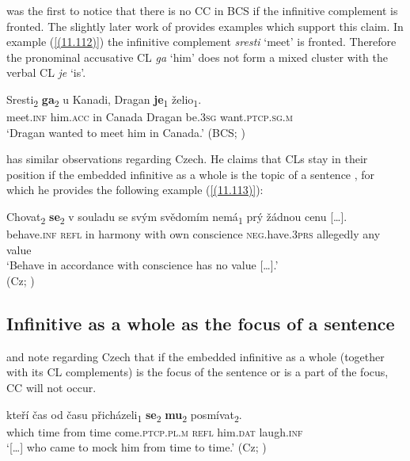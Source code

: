 \citet{Boskovic01} was the first to notice that there is no CC in BCS if the infinitive complement is fronted. The slightly later work of \citet[182f]{Stjepanovic04} provides examples which support this claim. In example (\ref{(11.112)}) the infinitive complement \textit{sresti} ‘meet’ is fronted. Therefore the pronominal accusative CL \textit{ga} ‘him’ does not form a mixed cluster with the verbal CL \textit{je} ‘is’. 

\begin{exe}\ex\label{(11.112)}
\gll Sresti\textsubscript{2} \textbf{ga}\textsubscript{2} u Kanadi, Dragan \textbf{je}\textsubscript{1} želio\textsubscript{1}. \\
meet.\textsc{inf} him.\textsc{acc} in Canada Dragan be.3\textsc{sg} want.\textsc{ptcp}.\textsc{sg}.\textsc{m} \\
\glt ‘Dragan wanted to meet him in Canada.’
\hfill (BCS; \citealt[182]{Stjepanovic04})
\end{exe}

\noindent \citet{Junghanns02} has similar observations regarding Czech. He claims that CLs stay in their position if the embedded infinitive as a whole is the topic of a sentence \citep[cf.][78]{Junghanns02}, for which he provides the following example (\ref{(11.113)}):

\begin{exe}\ex\label{(11.113)}
\gll Chovat\textsubscript{2} \textbf{se}\textsubscript{2} v souladu se svým svědomím nemá\textsubscript{1} prý žádnou {cenu [\dots].} \\
behave.\textsc{inf} \textsc{refl} in harmony with own conscience \textsc{neg}.have.\textsc{3prs} allegedly any value \\
\glt ‘Behave in accordance with conscience has no value [\dots].’ \\
\hfill (Cz; \citealt[78]{Junghanns02})
\end{exe}

\subsection{Infinitive as a whole as the focus of a sentence}
\label{Infinitive as a whole as the focus of a sentence}

\citet[78]{Junghanns02} and \citet[98]{Dotlacil04} note regarding Czech that if the embedded infinitive as a whole (together with its CL complements) is the focus of the sentence or is a part of the focus, CC will not occur.

\begin{exe}\ex\label{(11.114)}
\gll [\dots] kteří čas od času přicházeli\textsubscript{1} \textbf{se}\textsubscript{2} \textbf{mu}\textsubscript{2} posmívat\textsubscript{2}. \\
{} which time from time come.\textsc{ptcp}.\textsc{pl}.\textsc{m} \textsc{refl} him.\textsc{dat} laugh.\textsc{inf} \\
\glt ‘[\dots] who came to mock him from time to time.’
\hfill (Cz; \citealt[79]{Junghanns02})
\end{exe}

